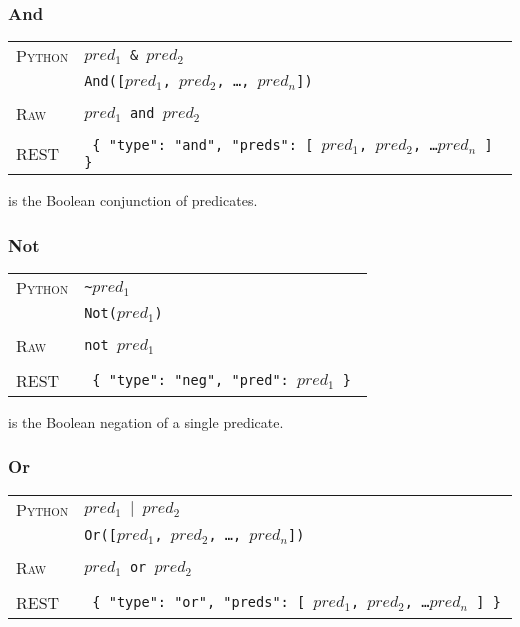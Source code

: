 \subsubsection{And}

\bigskip
\begin{tabularx}{\linewidth}{lX}
\textsc{Python}   & \texttt{$pred_1$ \& $pred_2$} \\
    & \texttt{And([$pred_1$, $pred_2$, \ldots, $pred_n$])} \\ \\
\textsc{Raw}    & \texttt{$pred_1$ and $pred_2$}  \\ \\
\textsc{REST} & \texttt{ \{ "type": "and", "preds": [ $pred_1$, $pred_2$, \ldots $pred_n$ ] \} } 
\end{tabularx}

 is the Boolean conjunction of predicates. 

\subsubsection{Not}

\bigskip
\begin{tabularx}{\linewidth}{lX}
\textsc{Python}   & \texttt{\textasciitilde $pred_1$} \\
    & \texttt{Not($pred_1$)} \\ \\
\textsc{Raw}    & \texttt{not $pred_1$}  \\ \\
\textsc{REST} & \texttt{ \{ "type": "neg", "pred": $pred_1$ \} } 
\end{tabularx}

 is the Boolean negation of a single predicate.

\subsubsection{Or}

\bigskip
\begin{tabularx}{\linewidth}{lX}
\textsc{Python}   & \texttt{$pred_1$ $\vert$ $pred_2$} \\
    & \texttt{Or([$pred_1$, $pred_2$, \ldots, $pred_n$])} \\ \\
\textsc{Raw}    & \texttt{$pred_1$ or $pred_2$}  \\ \\
\textsc{REST} & \texttt{ \{ "type": "or", "preds": [ $pred_1$, $pred_2$, \ldots $pred_n$ ] \} } \end{tabularx}

